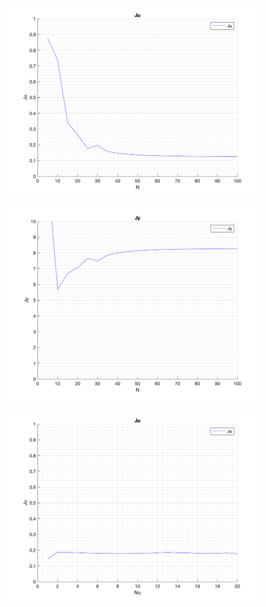 \documentclass[a4paper, 11pt]{article}
\begin{document}
\begin{enumerate}
 \includegraphics[width=\linewidth]{./ModelsP4_J/JuN.png} 
 
 \includegraphics[width=\linewidth]{./ModelsP4_J/JyN.png} 
 
 \includegraphics[width=\linewidth]{./ModelsP4_J/JuNu.png} 
 

\end{enumerate}
\end{document}
